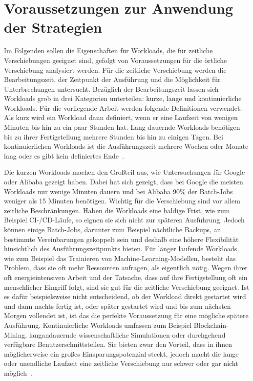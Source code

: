 \section{Voraussetzungen zur Anwendung der Strategien}\label{CAP:requirements}
Im Folgenden sollen die Eigenschaften für Workloads, die für zeitliche Verschiebungen geeignet sind, gefolgt von Voraussetzungen für die örtliche Verschiebung analysiert werden.
Für die zeitliche Verschiebung werden die Bearbeitungszeit, der Zeitpunkt der Ausführung und die Möglichkeit für Unterbrechungen untersucht.
Bezüglich der Bearbeitungszeit lassen sich Workloads grob in drei Kategorien unterteilen: kurze, lange und kontinuierliche Workloads.
Für die vorliegende Arbeit werden folgende Definitionen verwendet:
Als kurz wird ein Workload dann definiert, wenn er eine Laufzeit von wenigen Minuten bis hin zu ein paar Stunden hat.
Lang dauernde Workloads benötigen bis zu ihrer Fertigstellung mehrere Stunden bis hin zu einigen Tagen.
Bei kontinuierlichen Workloads ist die Ausführungszeit mehrere Wochen oder Monate lang oder es gibt kein definiertes Ende~\cite{Wiesner.2021}.

Die kurzen Workloads machen den Großteil aus, wie Untersuchungen für Google oder Alibaba gezeigt haben.
Dabei hat sich gezeigt, dass bei Google die meisten Workloads nur wenige Minuten dauern und bei Alibaba 90\% der Batch-Jobs weniger als 15 Minuten benötigen.
Wichtig für die Verschiebung sind vor allem zeitliche Beschränkungen.
Haben die Workloads eine baldige Frist, wie zum Beispiel CI-/CD-Läufe, so eignen sie sich nicht zur späteren Ausführung.
Jedoch können einige Batch-Jobs, darunter zum Beispiel nächtliche Backups, an bestimmte Vereinbarungen gekoppelt sein und deshalb eine höhere Flexibilität hinsichtlich des Ausführungszeitpunkts bieten.
Für länger laufende Workloads, wie zum Beispiel das Trainieren von Machine-Learning-Modellen, besteht das Problem, dass sie oft mehr Ressourcen anfragen, als eigentlich nötig.
Wegen ihrer oft energieintensiven Arbeit und der Tatsache, dass auf ihre Fertigstellung oft ein menschlicher Eingriff folgt, sind sie gut für die zeitliche Verschiebung geeignet.
Ist es dafür beispielsweise nicht entscheidend, ob der Workload direkt gestartet wird und dann nachts fertig ist, oder später gestartet wird und bis zum nächsten Morgen vollendet ist, ist das die perfekte Voraussetzung für eine mögliche spätere Ausführung.
Kontinuierliche Workloads umfassen zum Beispiel Blockchain-Mining, langandauernde wissenschaftliche Simulationen oder durchgehend verfügbare Benutzerschnittstellen.
Sie bieten zwar den Vorteil, dass in ihnen möglicherweise ein großes Einsparungspotenzial steckt, jedoch macht die lange oder unendliche Laufzeit eine zeitliche Verschiebung nur schwer oder gar nicht möglich~\cite{Wiesner.2021}.

